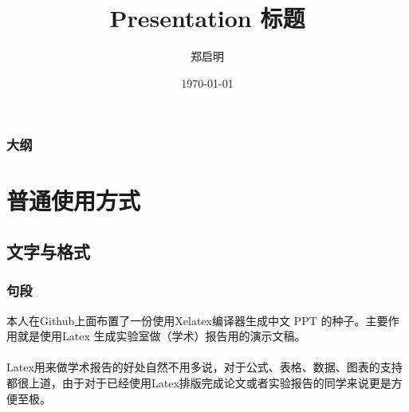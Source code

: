 \documentclass{beamer}
\title[PPT 模板]{Presentation 标题} %
\author{郑启明} %
\institute[SWJTU] %
{
西南交通大学 \\ %
\medskip
\textit{mail@qmz.me} %
}\setCJKmainfont{SimSun}
\date{\today} %
\begin{document}
\begin{frame}
\titlepage %
\end{frame}

\begin{frame}
\frametitle{大纲} %
\tableofcontents %
\end{frame}


\section{普通使用方式} %

\subsection{文字与格式} %

\begin{frame}
\frametitle{句段}

本人在Github上面布置了一份使用Xelatex编译器生成中文 PPT 的种子。主要作用就是使用Latex 生成实验室做（学术）报告用的演示文稿。\\~\\

Latex用来做学术报告的好处自然不用多说，对于公式、表格、数据、图表的支持都很上道，由于对于已经使用Latex排版完成论文或者实验报告的同学来说更是方便至极。

\end{frame}
\end{document}
